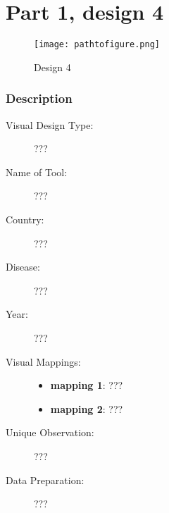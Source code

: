 \hypertarget{part-1-design-4}{%
\section{Part 1, design 4}\label{part-1-design-4}}

\begin{figure}
\centering
\texttt{[image: pathtofigure.png]}
\caption{Design 4}
\end{figure}

\hypertarget{description}{%
\subsubsection{Description}\label{description}}

\begin{description}
\item[Visual Design Type:]
???
\item[Name of Tool:]
???
\item[Country:]
???
\item[Disease:]
???
\item[Year:]
???
\item[Visual Mappings:]
\begin{itemize}
\tightlist
\item
  \textbf{mapping 1}: ???
\end{itemize}

\begin{itemize}
\tightlist
\item
  \textbf{mapping 2}: ???
\end{itemize}
\item[Unique Observation:]
???
\item[Data Preparation:]
???
\end{description}
